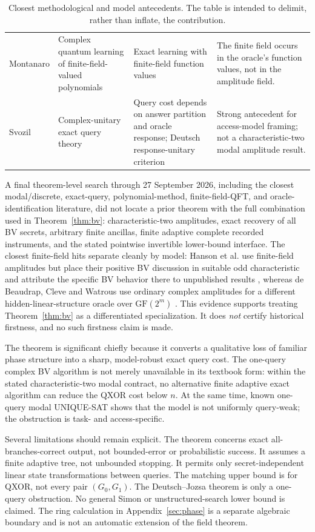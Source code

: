 \documentclass[11pt]{article}
\begin{document}
\begin{table}[ht]
\begin{tabular}{@{}L{.16\linewidth}L{.21\linewidth}L{.25\linewidth}L{.28\linewidth}@{}}
Montanaro \cite{Montanaro2012} & Complex quantum learning of finite-field-valued polynomials & Exact learning with finite-field function values & The finite field occurs in the oracle's function values, not in the amplitude field.\\
Svozil \cite{Svozil2026} & Complex-unitary exact query theory & Query cost depends on answer partition and oracle response; Deutsch response-unitary criterion & Strong antecedent for access-model framing; not a characteristic-two modal amplitude result.\\\bottomrule
\end{tabular}
\caption{Closest methodological and model antecedents. The table is intended to delimit, rather than inflate, the contribution.}\label{tab:prior}
\end{table}

A final theorem-level search through 27 September 2026, including the closest modal/discrete, exact-query, polynomial-method, finite-field-QFT, and oracle-identification literature, did not locate a prior theorem with the full combination used in Theorem~\ref{thm:bv}: characteristic-two amplitudes, exact recovery of all BV secrets, arbitrary finite ancillas, finite adaptive complete recorded instruments, and the stated pointwise invertible lower-bound interface. The closest finite-field hits separate cleanly by model: Hanson et al. use finite-field amplitudes but place their positive BV discussion in suitable odd characteristic and attribute the specific BV behavior there to unpublished results \cite{Hanson2014}, whereas de Beaudrap, Cleve and Watrous use ordinary complex amplitudes for a different hidden-linear-structure oracle over $\mathrm{GF}(2^m)$ \cite{deBeaudrap2002}. This evidence supports treating Theorem~\ref{thm:bv} as a differentiated specialization. It does \emph{not} certify historical firstness, and no such firstness claim is made.

The theorem is significant chiefly because it converts a qualitative loss of familiar phase structure into a sharp, model-robust exact query cost. The one-query complex BV algorithm is not merely unavailable in its textbook form: within the stated characteristic-two modal contract, no alternative finite adaptive exact algorithm can reduce the QXOR cost below $n$. At the same time, known one-query modal UNIQUE-SAT \cite{WillcockSabry2011} shows that the model is not uniformly query-weak; the obstruction is task- and access-specific.

Several limitations should remain explicit. The theorem concerns exact all-branches-correct output, not bounded-error or probabilistic success. It assumes a finite adaptive tree, not unbounded stopping. It permits only secret-independent linear state transformations between queries. The matching upper bound is for QXOR, not every pair $(G_0,G_1)$. The Deutsch--Jozsa theorem is only a one-query obstruction. No general Simon or unstructured-search lower bound is claimed. The ring calculation in Appendix~\ref{sec:phase} is a separate algebraic boundary and is not an automatic extension of the field theorem.
\end{document}
